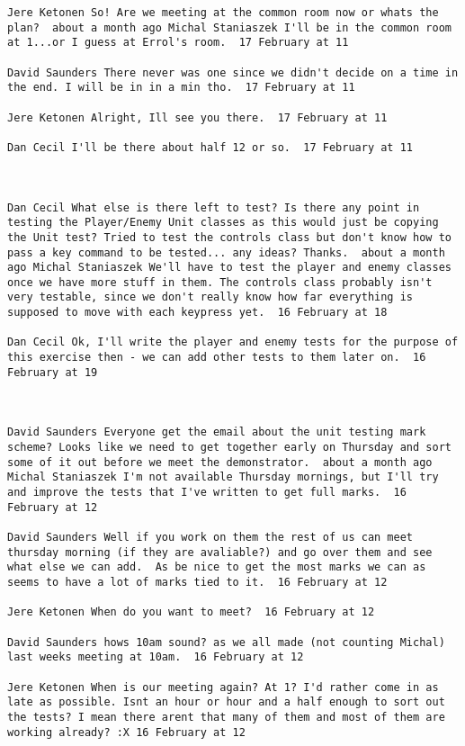 \begin{verbatim}
Jere Ketonen So! Are we meeting at the common room now or whats the
plan?  about a month ago Michal Staniaszek I'll be in the common room
at 1...or I guess at Errol's room.  17 February at 11

David Saunders There never was one since we didn't decide on a time in
the end. I will be in in a min tho.  17 February at 11

Jere Ketonen Alright, Ill see you there.  17 February at 11

Dan Cecil I'll be there about half 12 or so.  17 February at 11



Dan Cecil What else is there left to test? Is there any point in
testing the Player/Enemy Unit classes as this would just be copying
the Unit test? Tried to test the controls class but don't know how to
pass a key command to be tested... any ideas? Thanks.  about a month
ago Michal Staniaszek We'll have to test the player and enemy classes
once we have more stuff in them. The controls class probably isn't
very testable, since we don't really know how far everything is
supposed to move with each keypress yet.  16 February at 18

Dan Cecil Ok, I'll write the player and enemy tests for the purpose of
this exercise then - we can add other tests to them later on.  16
February at 19



David Saunders Everyone get the email about the unit testing mark
scheme? Looks like we need to get together early on Thursday and sort
some of it out before we meet the demonstrator.  about a month ago
Michal Staniaszek I'm not available Thursday mornings, but I'll try
and improve the tests that I've written to get full marks.  16
February at 12

David Saunders Well if you work on them the rest of us can meet
thursday morning (if they are avaliable?) and go over them and see
what else we can add.  As be nice to get the most marks we can as
seems to have a lot of marks tied to it.  16 February at 12

Jere Ketonen When do you want to meet?  16 February at 12

David Saunders hows 10am sound? as we all made (not counting Michal)
last weeks meeting at 10am.  16 February at 12

Jere Ketonen When is our meeting again? At 1? I'd rather come in as
late as possible. Isnt an hour or hour and a half enough to sort out
the tests? I mean there arent that many of them and most of them are
working already? :X 16 February at 12


\end{verbatim}
